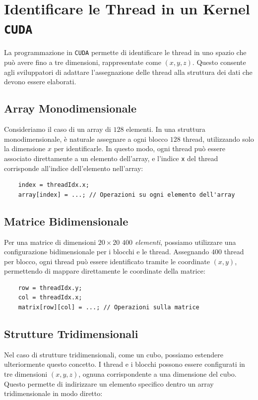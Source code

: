 \section{Identificare le Thread in un Kernel \texttt{CUDA}}
La programmazione in \texttt{CUDA} permette di identificare le thread
in uno spazio che può avere fino a tre dimensioni, rappresentate come
\((x, y, z)\). Questo consente agli sviluppatori di adattare l'assegnazione
delle thread alla struttura dei dati che devono essere elaborati.

\subsection{Array Monodimensionale}

Consideriamo il caso di un array di \(128\) elementi. In una struttura
monodimensionale, è naturale assegnare a ogni blocco \(128\) thread,
utilizzando solo la dimensione \(x\) per identificarle. In questo modo,
ogni thread può essere associato direttamente a un elemento dell'array,
e l'indice \texttt{x} del thread corrisponde all'indice dell'elemento
nell'array:

\begin{lstlisting}
    index = threadIdx.x; 
    array[index] = ...; // Operazioni su ogni elemento dell'array
\end{lstlisting}

\subsection{Matrice Bidimensionale}

Per una matrice di dimensioni \(20 \times 20\) \textit{$400$ elementi},
possiamo utilizzare una configurazione bidimensionale per i blocchi
e le thread. Assegnando \(400\) thread per blocco, ogni thread può
essere identificato tramite le coordinate \((x, y)\), permettendo
di mappare direttamente le coordinate della matrice:

\begin{lstlisting}
    row = threadIdx.y;
    col = threadIdx.x; 
    matrix[row][col] = ...; // Operazioni sulla matrice
\end{lstlisting}

\subsection{Strutture Tridimensionali}

Nel caso di strutture tridimensionali, come un cubo, possiamo estendere
ulteriormente questo concetto. I thread e i blocchi possono essere
configurati in tre dimensioni \((x, y, z)\), ognuna corrispondente
a una dimensione del cubo. Questo permette di indirizzare un elemento
specifico dentro un array tridimensionale in modo diretto:

